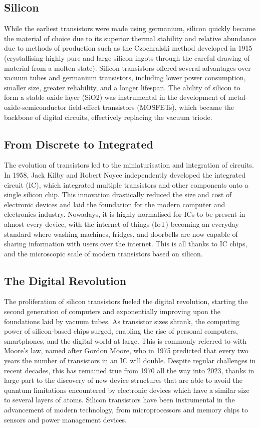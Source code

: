 \subsection{Silicon} 
While the earliest transistors were made using germanium, silicon quickly became the material of choice due to its superior thermal stability and relative abundance due to methods of production such as the Czochralski method developed in 1915 (crystallising highly pure and large silicon ingots through the careful drawing of material from a molten state). Silicon transistors offered several advantages over vacuum tubes and germanium transistors, including lower power consumption, smaller size, greater reliability, and a longer lifespan. The ability of silicon to form a stable oxide layer (SiO2) was instrumental in the development of metal-oxide-semiconductor field-effect transistors (MOSFETs), which became the backbone of digital circuits, effectively replacing the vacuum triode.

\subsection{From Discrete to Integrated} 
The evolution of transistors led to the miniaturisation and integration of circuits. In 1958, Jack Kilby and Robert Noyce independently developed the integrated circuit (IC), which integrated multiple transistors and other components onto a single silicon chip. This innovation drastically reduced the size and cost of electronic devices and laid the foundation for the modern computer and electronics industry. Nowadays, it is highly normalised for ICs to be present in almost every device, with the internet of things (IoT) becoming an everyday standard where washing machines, fridges, and doorbells are now capable of sharing information with users over the internet. This is all thanks to IC chips, and the microscopic scale of modern transistors based on silicon.

\subsection{The Digital Revolution} 
The proliferation of silicon transistors fueled the digital revolution, starting the second generation of computers and exponentially improving upon the foundations laid by vacuum tubes. As transistor sizes shrank, the computing power of silicon-based chips surged, enabling the rise of personal computers, smartphones, and the digital world at large. This is commonly referred to with Moore's law, named after Gordon Moore, who in 1975 predicted that every two years the number of transistors in an IC will double. Despite regular challenges in recent decades, this has remained true from 1970 all the way into 2023, thanks in large part to the discovery of new device structures that are able to avoid the quantum limitations encountered by electronic devices which have a similar size to several layers of atoms. Silicon transistors have been instrumental in the advancement of modern technology, from microprocessors and memory chips to sensors and power management devices. 

